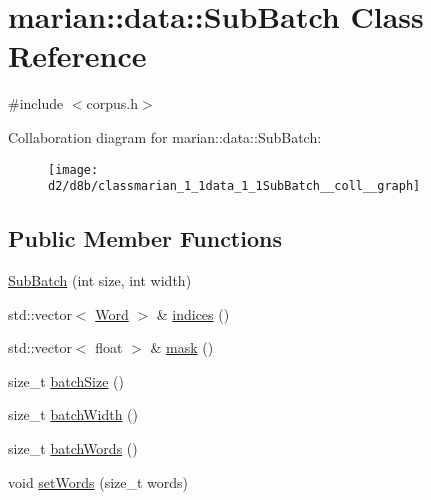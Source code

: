\hypertarget{classmarian_1_1data_1_1SubBatch}{}\section{marian\+:\+:data\+:\+:Sub\+Batch Class Reference}
\label{classmarian_1_1data_1_1SubBatch}


{\ttfamily \#include $<$corpus.\+h$>$}



Collaboration diagram for marian\+:\+:data\+:\+:Sub\+Batch\+:
\nopagebreak
\begin{figure}[H]
\begin{center}
\leavevmode
\texttt{[image: d2/d8b/classmarian\_1\_1data\_1\_1SubBatch\_\_coll\_\_graph]}
\end{center}
\end{figure}
\subsection*{Public Member Functions}
\begin{DoxyCompactItemize}
\item 
\hyperlink{classmarian_1_1data_1_1SubBatch_a63503b18510aa3519f6d28d7e9f0bacf}{Sub\+Batch} (int size, int width)
\item 
std\+::vector$<$ \hyperlink{namespacemarian_a5db8bee455c97a62d6a525dc48efe4c2}{Word} $>$ \& \hyperlink{classmarian_1_1data_1_1SubBatch_a5da7bbc559373641e9fd829e85cb3b76}{indices} ()
\item 
std\+::vector$<$ float $>$ \& \hyperlink{classmarian_1_1data_1_1SubBatch_ab247d3f0cf9cfd721fe34aaf4eb7a762}{mask} ()
\item 
size\+\_\+t \hyperlink{classmarian_1_1data_1_1SubBatch_ada99fc6fbcac283c8cdbb866cb4a261e}{batch\+Size} ()
\item 
size\+\_\+t \hyperlink{classmarian_1_1data_1_1SubBatch_af7f936fc9f96a1135ce68c07f0b890da}{batch\+Width} ()
\item 
size\+\_\+t \hyperlink{classmarian_1_1data_1_1SubBatch_a35a3232497a209161a61c3cd8e9e9952}{batch\+Words} ()
\item 
void \hyperlink{classmarian_1_1data_1_1SubBatch_a143906c1d19aaa6f431bd13e74c88be5}{set\+Words} (size\+\_\+t words)
\end{DoxyCompactItemize}
